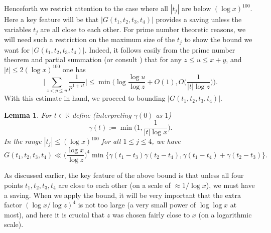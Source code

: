 \documentclass[12pt, notitlepage]{amsart}
\numberwithin{equation}{section}
\newtheorem{lemma}[theorem]{Lemma}
\theoremstyle{remark}
\theoremstyle{definition}
\theoremstyle{remark}
\numberwithin{equation}{section}
\begin{document}
Henceforth we restrict attention to the case where all $|t_j|$ are below $(\log x)^{100}$.   Here a key feature will be that $|G(t_1, t_2, t_3, t_4)|$ provides a saving unless the variables $t_j$ are all close to each other. For prime number theoretic reasons, we will need such a restriction on the maximum size of the $t_j$ to show the bound we want for $|G(t_1, t_2, t_3, t_4)|$. Indeed, it follows easily from the prime number theorem and partial summation (or consult  \cite[Number Theory Result 2]{Harperlargevalue}) that for any $z \le u \le x+y$, and $|t| \le 2(\log x)^{100}$ one has 
\begin{equation} 
\label{4.13} 
\Big| \sum_{z < p\le u} \frac{1}{p^{1+it}} \Big| \le \min \Big( \log \frac{\log u}{\log z} + O(1), O\Big( \frac{1}{|t| \log z} \Big) \Big) . 
\end{equation} 
With this estimate in hand, we proceed to bounding $|G(t_1,t_2,t_3,t_4)|$.  

\begin{lemma} \label{lem4.4}  For $t\in {\mathbb R}$ define (interpreting $\gamma(0)$ as $1$)
\begin{equation}\label{eqn: gamma}
    \gamma(t) := \min\Big( 1, \frac{1}{|t|\log x} \Big). 
\end{equation}
In the range $|t_j| \le (\log x)^{100}$ for all $1\le j\le 4$, we have 
\begin{equation} \label{eqn: G upper}
    G(t_1, t_2, t_3, t_4) \ll \Big( \frac{\log x}{\log z}\Big)^4   \min\{ \gamma(t_1-t_3)\gamma(t_2-t_4),  \gamma(t_1-t_4) +\gamma(t_2-t_3) \} .
\end{equation}
\end{lemma} 

  
   
 As discussed earlier, the key feature of the above bound is that unless all four points $t_1, t_2, t_3, t_4$ are close to each other (on a scale of $\approx 1/\log x$), we must have a saving.   When we apply the bound, it will be very important that the extra factor $(\log x/\log z)^4$ is not too large (a very small power of $\log\log x$ at most), and here it is crucial that $z$ was chosen fairly close to $x$ (on a logarithmic scale).
\end{document}
